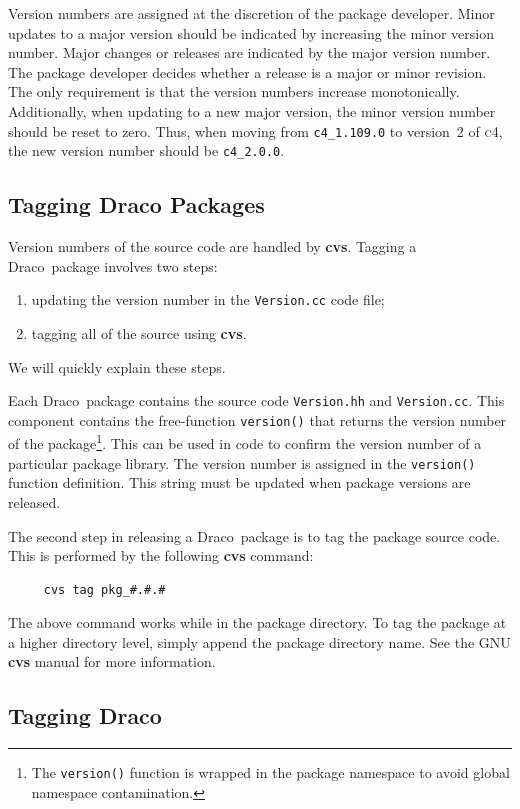 \documentclass[11pt]{nmemo}
\newcommand{\draco}{{\normalfont\normalsize\textsf Draco}}
\newcommand{\cfour}{{\normalfont\normalsize\scshape c\small 4}}
\begin{document}
Version numbers are assigned at the discretion of the package
developer.  Minor updates to a major version should be indicated by
increasing the minor version number.  Major changes or releases are
indicated by the major version number.  The package developer decides
whether a release is a major or minor revision.  The only requirement
is that the version numbers increase monotonically.  Additionally,
when updating to a new major version, the minor version number should
be reset to zero.  Thus, when moving from \texttt{c4\_1.109.0} to
version~2 of \cfour, the new version number should be
\texttt{c4\_2.0.0}.

\subsection{Tagging Draco Packages}

Version numbers of the source code are handled by {\bf cvs}.  Tagging
a \draco\ package involves two steps:
\begin{enumerate}
\item updating the version number in the \texttt{Version.cc} code
  file;
\item tagging all of the source using {\bf cvs}.
\end{enumerate}
We will quickly explain these steps.

Each \draco\ package contains the source code \texttt{Version.hh} and
\texttt{Version.cc}.  This component contains the free-function
\texttt{version()} that returns the version number of the
package\footnote{The \texttt{version()} function is wrapped in the
  package namespace to avoid global namespace contamination.}.  This
can be used in code to confirm the version number of a particular
package library.  The version number is assigned in the
\texttt{version()} function definition.  This string must be updated
when package versions are released.

The second step in releasing a \draco\ package is to tag the package
source code.  This is performed by the following {\bf cvs} command:
\begin{verbatim}
     cvs tag pkg_#.#.#
\end{verbatim}
The above command works while in the package directory.  To tag the
package at a higher directory level, simply append the package
directory name.  See the GNU {\bf cvs} manual for more information.

\subsection{Tagging Draco}
\end{document}
